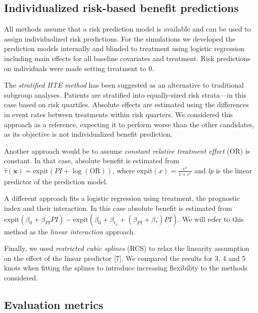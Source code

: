 \documentclass{article}
\begin{document}
\hypertarget{individualized-risk-based-benefit-predictions}{%
\subsection{Individualized risk-based benefit
predictions}\label{individualized-risk-based-benefit-predictions}}

All methods assume that a risk prediction model is available and can be
used to assign individualized risk predictions. For the simulations we
developed the prediction models internally and blinded to treatment
using logistic regression including main effects for all baseline
covariates and treatment. Risk predictions on individuals were made
setting treatment to \(0\).

The \emph{stratified HTE method} has been suggested as an alternative to
traditional subgroup analyses. Patients are stratified into
equally-sized risk strata---in this case based on risk quartiles.
Absolute effects are estimated using the differences in event rates
between treatments within risk quarters. We considered this approach as
a reference, expecting it to perform worse than the other candidates, as
its objective is not individualized benefit prediction.

Another approach would be to assume \emph{constant relative treatment
effect} (OR) is constant. In that case, absolute benefit is estimated
from \(\hat{\tau}(\bm{x}) = \text{expit}(PI +\log(\text{OR}))\), where
\(\text{expit}(x)=\frac{e^x}{1+e^x}\) and \emph{lp} is the linear
predictor of the prediction model.

A different approach fits a logistic regression using treatment, the
prognostic index and their interaction. In this case absolute benefit is
estimated from
\(\text{expit}(\beta_0+\beta_{PI}PI) - \text{expit}(\beta_0+\beta_{t_x}+(\beta_{PI}+\beta_*)PI)\).
We will refer to this method as the \emph{linear interaction} approach.

Finally, we used \emph{restricted cubic splines} (RCS) to relax the
linearity assumption on the effect of the linear predictor {[}7{]}. We
compared the results for 3, 4 and 5 knots when fitting the splines to
introduce increasing flexibility to the methods considered.

\hypertarget{evaluation-metrics}{%
\subsection{Evaluation metrics}\label{evaluation-metrics}}
\end{document}
